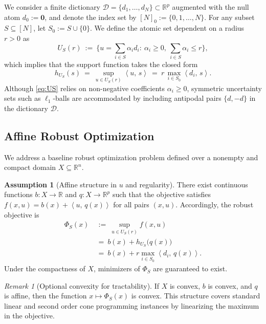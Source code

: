 \documentclass[accepted]{uai2026}
\theoremstyle{plain}
\theoremstyle{definition}
\newtheorem{assumption}[theorem]{Assumption}
\theoremstyle{remark}
\newtheorem{remark}[theorem]{Remark}
\newcommand{\R}{\mathbb{R}}
\newcommand{\ip}[2]{\left\langle #1 ,\, #2 \right\rangle}
\begin{document}
We consider a finite dictionary $\mathcal{D}=\{d_1,\dots,d_N\}\subset\R^p$ augmented with the null atom $d_0:=\bm{0}$, and denote the index set by $[N]_0:=\{0,1,\dots,N\}$. For any subset $S\subseteq[N]$, let $S_0:=S\cup\{0\}$. We define the atomic set dependent on a radius $r>0$ as
\begin{equation}\label{eq:US}
U_S(r)\ :=\ \Big\{u=\sum_{i\in S}\alpha_i d_i:\ \alpha_i\ge 0,\ \sum_{i\in S}\alpha_i\le r\Big\},
\end{equation}
which implies that the support function takes the closed form
\begin{equation}\label{eq:support}
h_{U_S}(s)\ =\ \sup_{u\in U_S(r)}\ip{u}{s}\ =\ r\,\max_{i\in S_0}\ip{d_i}{s}.
\end{equation}
Although \eqref{eq:US} relies on non-negative coefficients $\alpha_i \ge 0$, symmetric uncertainty sets such as $\ell_1$-balls are accommodated by including antipodal pairs $\{d, -d\}$ in the dictionary $\mathcal{D}$.

\subsection{Affine Robust Optimization}

We address a baseline robust optimization problem defined over a nonempty and compact domain $X\subseteq\R^n$.

\begin{assumption}[Affine structure in $u$ and regularity]\label{asp:lin-u}
There exist continuous functions $b:X\to\R$ and $q:X\to\R^p$ such that the objective satisfies $f(x,u)=b(x)+\ip{u}{q(x)}$ for all pairs $(x,u)$. Accordingly, the robust objective is
\begin{equation}\label{eq:Phi_definition}
\begin{split}
    \Phi_S(x)\ &:=\ \sup_{u\in U_S(r)} f(x,u) \\
    &=\ b(x)+h_{U_S}\big(q(x)\big) \\
    &=\ b(x)+r\max_{i\in S_0}\ip{d_i}{q(x)}.
\end{split}
\end{equation}
Under the compactness of $X$, minimizers of $\Phi_S$ are guaranteed to exist.
\end{assumption}

\begin{remark}[Optional convexity for tractability]
If $X$ is convex, $b$ is convex, and $q$ is affine, then the function $x\mapsto \Phi_S(x)$ is convex. This structure covers standard linear and second order cone programming instances by linearizing the maximum in the objective.
\end{remark}
\end{document}

